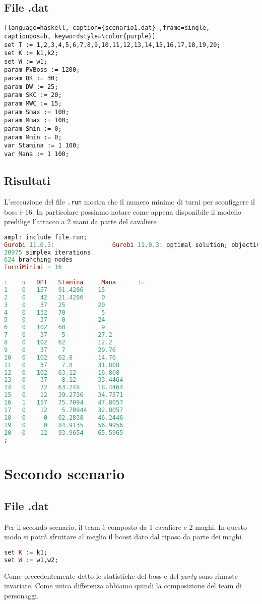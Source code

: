 \documentclass[12pt]{article}
\begin{document}
\subsection{File .dat}
\begin{lstlisting}[language=haskell, caption={scenario1.dat} ,frame=single, captionpos=b, keywordstyle=\color{purple}]  
set T := 1,2,3,4,5,6,7,8,9,10,11,12,13,14,15,16,17,18,19,20;
set K := k1,k2;
set W := w1;    
param PVBoss := 1200;
param DK := 30;
param DW := 25;
param SKC := 20;
param MWC := 15;
param Smax := 100;
param Mmax := 100;
param Smin := 0;
param Mmin := 0;
var Stamina := 1 100;
var Mana := 1 100;
\end{lstlisting}
\subsection{Risultati}
L’esecuzione del file \texttt{.run} mostra che il numero minimo di turni per sconfiggere il boss è 16. In particolare possiamo notare come appena disponibile il modello predilige l'attacco a 2 mani da parte del cavaliere
\begin{lstlisting}[language=haskell, frame=single, captionpos=b, keywordstyle=\color{purple}]  
ampl: include file.run;
Gurobi 11.0.3:                Gurobi 11.0.3: optimal solution; objective 16
20975 simplex iterations
624 branching nodes
TurniMinimi = 16
    
:    u   DPT   Stamina     Mana      :=
1    0   157   91.4286    15
2    0    42   21.4286     0
3    0    37   25         20
4    0   132   70          5
5    0    37    0         24
6    0   102   60          9
7    0    37    5         27.2
8    0   102   62         12.2
9    0    37    7         29.76
10   0   102   62.8       14.76
11   0    37    7.8       31.808
12   0   102   63.12      16.808
13   0    37    8.12      33.4464
14   0    72   63.248     18.4464
15   0    12   39.2736    34.7571
16   1   157   75.7094    47.8057
17   0    12    5.70944   32.8057
18   0     0   62.2838    46.2446
19   0     0   84.9135    56.9956
20   0    12   93.9654    65.5965
;    
\end{lstlisting}
\newpage
\section{Secondo scenario}
\subsection{File .dat}
Per il secondo scenario, il team è composto da 1 cavaliere e 2 maghi. In questo modo si potrà sfruttare al meglio il boost dato dal riposo da parte dei maghi.
\begin{lstlisting}[language=haskell, frame=single, captionpos=b, keywordstyle=\color{purple}]  
set K := k1;
set W := w1,w2;
\end{lstlisting}
Come precedentemente detto le statistiche del boss e del \textit{party} sono rimaste invariate. Come unica differenza abbiamo quindi la composizione del team di personaggi.
\end{document}
